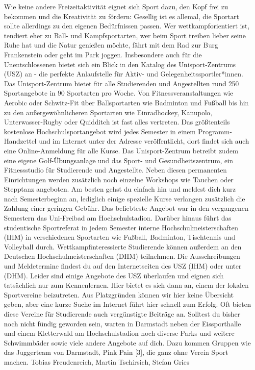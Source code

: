 {Wie keine andere Freizeitaktivität eignet sich Sport dazu, den Kopf frei zu bekommen und die Kreativität zu fördern: Gesellig ist es allemal, die Sportart sollte allerdings zu den eigenen Bedürfnissen passen.
}{
Wer wettkampforientiert ist, tendiert eher zu Ball- und Kampfsportarten, wer beim Sport treiben lieber seine Ruhe hat und die Natur genießen möchte, fährt mit dem Rad zur Burg Frankenstein oder geht im Park joggen.
Insbesondere auch für die Unentschlossenen bietet sich ein Blick in den Katalog des Unisport-Zentrums (USZ) an - die perfekte Anlaufstelle für Aktiv- und Gelegenheitssportler*innen. Das Unisport-Zentrum bietet für alle Studierenden und Angestellten rund 250 Sportangebote in 90 Sportarten pro Woche. Von Fitnessveranstaltungen wie Aerobic oder Schwitz-Fit über Ballsportarten wie Badminton und Fußball bis hin zu den außergewöhnlicheren Sportarten wie Einradhockey, Kanupolo, Unterwasser-Rugby oder Quidditch ist fast alles vertreten.
Das größtenteils kostenlose Hochschulsportangebot wird jedes Semester in einem Programm-Handzettel und im Internet unter der Adresse \footnotemark[1]  veröffentlicht, dort findet sich auch eine Online-Anmeldung für alle Kurse. Das Unisport-Zentrum betreibt zudem eine eigene Golf-Übungsanlage und das Sport- und Gesundheitszentrum, ein Fitnessstudio für Studierende und Angestellte. Neben diesen permanenten Einrichtungen werden zusätzlich noch einzelne Workshops wie Tauchen oder Stepptanz angeboten.
Am besten gehst du einfach hin und meldest dich kurz nach Semesterbeginn an, lediglich einige spezielle Kurse verlangen zusätzlich die Zahlung einer geringen Gebühr. Das beliebteste Angebot war in den vergangenen Semestern das Uni-Freibad am Hochschulstadion. Darüber hinaus führt das studentische Sportreferat in jedem Semester interne Hochschulmeisterschaften (IHM) in verschiedenen Sportarten wie Fußball, Badminton, Tischtennis und Volleyball durch. Wettkampfinteressierte Studierende können außerdem an den Deutschen Hochschulmeisterschaften (DHM) teilnehmen. Die Ausschreibungen und Meldetermine findest du auf den Internetseiten des USZ (IHM) oder unter \footnotemark[2] (DHM).
Leider sind einige Angebote des USZ überlaufen und eignen sich tatsächlich nur zum Kennenlernen. Hier bietet es sich dann an, einem der lokalen Sportvereine beizutreten. Aus Platzgründen können wir hier keine Übersicht geben, aber eine kurze Suche im Internet führt hier schnell zum Erfolg. Oft bieten diese Vereine für Studierende auch vergünstigte Beiträge an.
Solltest du bisher noch nicht fündig geworden sein, warten in Darmstadt neben der Eissporthalle und einem Kletterwald am Hochschulstadion noch diverse Parks und weitere Schwimmbäder sowie viele andere Angebote auf dich.
Dazu kommen Gruppen wie das Juggerteam von Darmstadt, Pink Pain [3], die ganz ohne Verein Sport machen.
}
{Tobias Freudenreich, Martin Tschirsich, Stefan Gries}

\newpage
